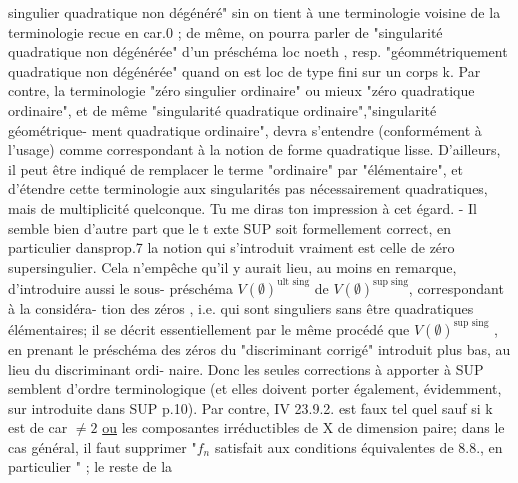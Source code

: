 
singulier quadratique  non dégénéré" sin on tient à une terminologie
voisine de la terminologie  recue en car.0 ; de même, on pourra
parler de "singularité quadratique non dégénérée" d'un préschéma loc
noeth , resp. "géommétriquement  quadratique non dégénérée" quand on est
loc de type fini sur un corps k.  Par contre, la terminologie
"zéro singulier ordinaire" ou mieux "zéro quadratique ordinaire",
et de même "singularité quadratique ordinaire","singularité géométrique-%
ment quadratique ordinaire",  devra s'entendre (conformément à l'usage)
comme correspondant à la notion de forme quadratique lisse. D'ailleurs,
il peut être indiqué de remplacer le terme "ordinaire" par "élémentaire",
et d'étendre cette terminologie aux singularités pas nécessairement
quadratiques, mais de multiplicité quelconque. Tu me diras ton impression
à cet égard.   -    Il semble bien d'autre part que le t exte SUP soit
formellement correct, en particulier dans\hand{/}prop.7  la notion qui s'introduit
vraiment est celle de zéro supersingulier.  Cela n'empêche qu'il y aurait
lieu, au moins en remarque, d'introduire aussi  le sous-%
préschéma  $V(\emptyset)^{\text{ult sing}}$  de $V(\emptyset)^{\text{sup sing}}$, correspondant à la considéra-%
tion des zéros , i.e.  qui sont singuliers sans être
quadratiques élémentaires; il se décrit essentiellement par le même
procédé que $V(\emptyset)^{\text{sup sing}}$  , en prenant le préschéma des zéros du
"discriminant corrigé"  introduit plus bas, au lieu du discriminant ordi-%
naire.  Donc les seules corrections à apporter à SUP semblent d'ordre
terminologique (et elles doivent porter également, évidemment, sur 
\hand{,}
introduite \hand{$\checkmark$}dans SUP p.10\hand{/}).  Par contre,  IV 23.9.2. est faux tel quel
sauf si k est de car $\neq 2$ \uline{ou} les composantes irréductibles de X  de
dimension paire; dans le cas général, il faut supprimer "$f_n$ satisfait
aux conditions équivalentes de 8.8., en particulier " ; le reste de la

